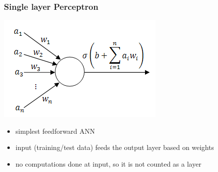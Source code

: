 \documentclass[xcolor=table]{beamer}
\begin{document}
\begin{mdframe}%

\frametitle{Single layer Perceptron}\label{heading-sec-single-layer-perceptron}%

\noindent{}\includegraphics[keepaspectratio=true,width=\dimmin{}{\dimwidth{0.90}}]{images/Capture}{}%

\begin{itemize}%

\item{}
simplest feedforward ANN%

\item{}
input (training/test data) feeds the output layer based on weights%

\item{}
no computations done at input, so it is not counted as a layer%
\end{itemize}%
\end{mdframe}\label{sec-single-layer-perceptron}%
\end{document}

